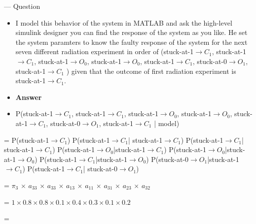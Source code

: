 --- Question

\begin{itemize}
\item I model this behavior of the system in MATLAB and ask the high-level simulink designer you can find the response of the system as you like. He set the system paramters to know the faulty response of the system for the next seven different radiation experiment in order of (stuck-at-1$\rightarrow C_{1}$, stuck-at-1$\rightarrow C_{1}$, stuck-at-1$\rightarrow O_{0}$, stuck-at-1$\rightarrow O_{0}$, stuck-at-1$\rightarrow C_{1}$, stuck-at-0$\rightarrow O_{1}$, stuck-at-1$\rightarrow C_{1}$  ) given that the outcome of first radiation experiment is stuck-at-1$\rightarrow C_{1}$.

\item \textbf{Answer}


\item P(stuck-at-1$\rightarrow C_{1}$, stuck-at-1$\rightarrow C_{1}$, stuck-at-1$\rightarrow O_{0}$, stuck-at-1$\rightarrow O_{0}$, stuck-at-1$\rightarrow C_{1}$, stuck-at-0$\rightarrow O_{1}$, stuck-at-1$\rightarrow C_{1}$ | model)
\end{itemize}

\hspace{0.2cm} = P(stuck-at-1$\rightarrow C_{1}$) P(stuck-at-1$\rightarrow C_{1}$| stuck-at-1$\rightarrow C_{1}$) P(stuck-at-1$\rightarrow C_{1}$| stuck-at-1$\rightarrow C_{1}$) P(stuck-at-1$\rightarrow O_{0}$|stuck-at-1$\rightarrow C_{1}$) P(stuck-at-1$\rightarrow O_{0}$|stuck-at-1$\rightarrow O_{0}$) P(stuck-at-1$\rightarrow C_{1}$|stuck-at-1$\rightarrow O_{0}$) P(stuck-at-0$\rightarrow O_{1}$|stuck-at-1$\rightarrow C_{1}$) P(stuck-at-1$\rightarrow C_{1}$| stuck-at-0$\rightarrow O_{1}$)

\hspace{0.2cm} = $\pi_3$ $\times$ $a_33$ $\times$ $a_33$ $\times$ $a_13$ $\times$ $a_11$ $\times$ $a_31$ $\times$ $a_23$ $\times$ $a_32$

\hspace{0.2cm} = $1 \times 0.8 \times 0.8 \times 0.1 \times 0.4 \times 0.3 \times 0.1 \times 0.2$

\hspace{0.2cm} = 
















